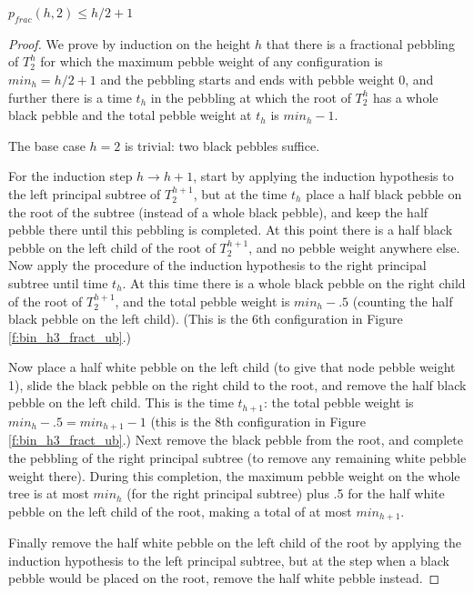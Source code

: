 \documentclass[oribib1]{llncs}
\newcommand{\ra}{\rightarrow}
\begin{document}
\begin{proposition}\label{p:frac.d=2}
$p_{frac}(h,2) \le h/2+1$
\end{proposition}
\begin{proof}
We prove by induction on the height $h$ that there is a fractional
pebbling of $T^h_2$ for which the maximum pebble weight of any
configuration is $min_h = h/2+1$ and the pebbling starts and ends with
pebble weight 0, and further there is a time
$t_h$ in the pebbling at which the root of $T^h_2$ has a whole
black pebble and the total pebble weight at $t_h$ is $min_h -1$.

The base case $h=2$ is trivial:  two black pebbles suffice.

For the induction step $h\ra h+1$, start by applying 
the induction hypothesis to the left principal subtree of $T^{h+1}_2$,
but at the time $t_h$ place a half black pebble on the root of the subtree
(instead of a whole black pebble), and keep the half pebble there
until this pebbling is completed.  At this point there is a half
black pebble on the left child of the root of $T^{h+1}_2$, and no
pebble weight anywhere else.  Now apply the procedure of the
induction hypothesis
to the right principal subtree until time $t_h$.  At this time there
is a whole black pebble on the right child of the root of $T^{h+1}_2$,
and the total pebble weight is $min_h -.5$ (counting the half black
pebble on the left child).  (This is the 6th configuration in
Figure \ref{f:bin_h3_fract_ub}.)

Now place a half white pebble on the left child (to give that node
pebble weight 1), slide the black
pebble on the right child to the root, and remove the half black
pebble on the left child.  This is the time $t_{h+1}$:  the
total pebble weight is $min_h-.5 = min_{h+1} -1$ (this is the
8th configuration in Figure \ref{f:bin_h3_fract_ub}.)
Next remove the black pebble from the root, and complete the
pebbling of the right principal subtree (to remove any remaining
white pebble weight there).  During this completion, the maximum
pebble weight on the whole tree is at most $min_h$ (for the
right principal subtree) plus .5 for the half white pebble on the
left child of the root, making a total of at most $min_{h+1}$.

Finally remove the half white pebble on the left child of the root
by applying the induction hypothesis to the left principal subtree,
but at the step when a black pebble would be placed on the root,
remove the half white pebble instead.
\end{proof}
\end{document}
